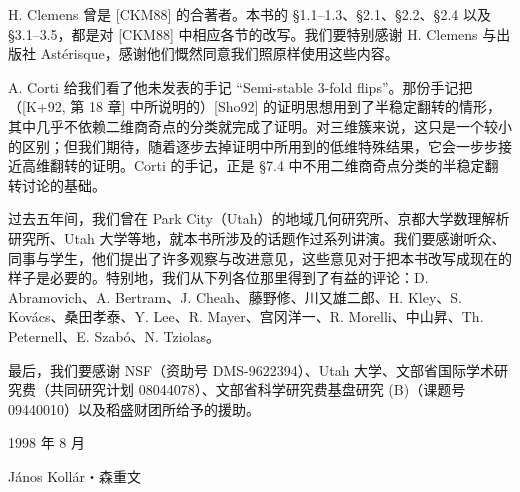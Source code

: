 H. Clemens 曾是 [CKM88] 的合著者。本书的 §1.1–1.3、§2.1、§2.2、§2.4 以及 §3.1–3.5，都是对 [CKM88] 中相应各节的改写。我们要特别感谢 H. Clemens 与出版社 Astérisque，感谢他们慨然同意我们照原样使用这些内容。%

A. Corti 给我们看了他未发表的手记 “Semi-stable 3-fold flips”。那份手记把（[K+92, 第 18 章] 中所说明的）[Sho92] 的证明思想用到了半稳定翻转的情形，其中几乎不依赖二维商奇点的分类就完成了证明。对三维簇来说，这只是一个较小的区别；但我们期待，随着逐步去掉证明中所用到的低维特殊结果，它会一步步接近高维翻转的证明。Corti 的手记，正是 §7.4 中不用二维商奇点分类的半稳定翻转讨论的基础。

过去五年间，我们曾在 Park City（Utah）的地域几何研究所、京都大学数理解析研究所、Utah 大学等地，就本书所涉及的话题作过系列讲演。我们要感谢听众、同事与学生，他们提出了许多观察与改进意见，这些意见对于把本书改写成现在的样子是必要的。特别地，我们从下列各位那里得到了有益的评论：D. Abramovich、A. Bertram、J. Cheah、藤野修、川又雄二郎、H. Kley、S. Kovács、桑田孝泰、Y. Lee、R. Mayer、宫冈洋一、R. Morelli、中山昇、Th. Peternell、E. Szabó、N. Tziolas。

最后，我们要感谢 NSF（资助号 DMS-9622394）、Utah 大学、文部省国际学术研究费（共同研究计划 08044078）、文部省科学研究费基盘研究 (B)（课题号 09440010）以及稻盛财团所给予的援助。

\medskip
\noindent\hfill 1998 年 8 月

\noindent\hfill János Kollár・森重文
